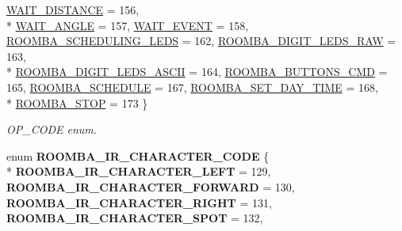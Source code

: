 \begin{DoxyCompactItemize}
\hyperlink{group__roomba-lib_gga305e17dfb7050ad83ea49ded2e6a2e24a35cc18edb14f8cc7586f8767d2a57585}{W\+A\+I\+T\+\_\+\+D\+I\+S\+T\+A\+N\+C\+E} = 156, 
\\*
\hyperlink{group__roomba-lib_gga305e17dfb7050ad83ea49ded2e6a2e24afe16224c28a9b186c8357e539358d96e}{W\+A\+I\+T\+\_\+\+A\+N\+G\+L\+E} = 157, 
\hyperlink{group__roomba-lib_gga305e17dfb7050ad83ea49ded2e6a2e24a4c81a6746d2eacab9a179c21531658fd}{W\+A\+I\+T\+\_\+\+E\+V\+E\+N\+T} = 158, 
\hyperlink{group__roomba-lib_gga305e17dfb7050ad83ea49ded2e6a2e24a86faa808c27ddad1404fa882193f0db7}{R\+O\+O\+M\+B\+A\+\_\+\+S\+C\+H\+E\+D\+U\+L\+I\+N\+G\+\_\+\+L\+E\+D\+S} = 162, 
\hyperlink{group__roomba-lib_gga305e17dfb7050ad83ea49ded2e6a2e24acd27e02da97cb9cc482177a27e135c45}{R\+O\+O\+M\+B\+A\+\_\+\+D\+I\+G\+I\+T\+\_\+\+L\+E\+D\+S\+\_\+\+R\+A\+W} = 163, 
\\*
\hyperlink{group__roomba-lib_gga305e17dfb7050ad83ea49ded2e6a2e24a094d22b24aae1379b33389cf701b5356}{R\+O\+O\+M\+B\+A\+\_\+\+D\+I\+G\+I\+T\+\_\+\+L\+E\+D\+S\+\_\+\+A\+S\+C\+I\+I} = 164, 
\hyperlink{group__roomba-lib_gga305e17dfb7050ad83ea49ded2e6a2e24ab369d673cdfb4414fb307ddaef5288dd}{R\+O\+O\+M\+B\+A\+\_\+\+B\+U\+T\+T\+O\+N\+S\+\_\+\+C\+M\+D} = 165, 
\hyperlink{group__roomba-lib_gga305e17dfb7050ad83ea49ded2e6a2e24ac4b9ca54bc982f8b9b565c72cb642ccc}{R\+O\+O\+M\+B\+A\+\_\+\+S\+C\+H\+E\+D\+U\+L\+E} = 167, 
\hyperlink{group__roomba-lib_gga305e17dfb7050ad83ea49ded2e6a2e24a17519d3bc7b9e8c70af28afe85d92229}{R\+O\+O\+M\+B\+A\+\_\+\+S\+E\+T\+\_\+\+D\+A\+Y\+\_\+\+T\+I\+M\+E} = 168, 
\\*
\hyperlink{group__roomba-lib_gga305e17dfb7050ad83ea49ded2e6a2e24a4c60272718e8bd851c58e6a9545f0d9f}{R\+O\+O\+M\+B\+A\+\_\+\+S\+T\+O\+P} = 173
 \}
\begin{DoxyCompactList}\small\item\em O\+P\+\_\+\+C\+O\+D\+E enum. \end{DoxyCompactList}\item 
\hypertarget{group__roomba-lib_ga2026337683ba0d60af6b639e7a56456d}{}enum {\bfseries R\+O\+O\+M\+B\+A\+\_\+\+I\+R\+\_\+\+C\+H\+A\+R\+A\+C\+T\+E\+R\+\_\+\+C\+O\+D\+E} \{ \\*
{\bfseries R\+O\+O\+M\+B\+A\+\_\+\+I\+R\+\_\+\+C\+H\+A\+R\+A\+C\+T\+E\+R\+\_\+\+L\+E\+F\+T} = 129, 
{\bfseries R\+O\+O\+M\+B\+A\+\_\+\+I\+R\+\_\+\+C\+H\+A\+R\+A\+C\+T\+E\+R\+\_\+\+F\+O\+R\+W\+A\+R\+D} = 130, 
{\bfseries R\+O\+O\+M\+B\+A\+\_\+\+I\+R\+\_\+\+C\+H\+A\+R\+A\+C\+T\+E\+R\+\_\+\+R\+I\+G\+H\+T} = 131, 
{\bfseries R\+O\+O\+M\+B\+A\+\_\+\+I\+R\+\_\+\+C\+H\+A\+R\+A\+C\+T\+E\+R\+\_\+\+S\+P\+O\+T} = 132, 

\end{DoxyCompactItemize}

